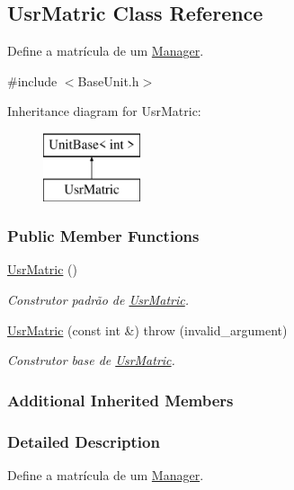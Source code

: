 \hypertarget{classUsrMatric}{\subsection{Usr\-Matric Class Reference}
\label{d4/d69/classUsrMatric}
}


Define a matrícula de um \hyperlink{classManager}{Manager}.  




{\ttfamily \#include $<$Base\-Unit.\-h$>$}

Inheritance diagram for Usr\-Matric\-:\begin{figure}[H]
\begin{center}
\leavevmode
\includegraphics[height=2.000000cm]{d4/d69/classUsrMatric}
\end{center}
\end{figure}
\subsubsection*{Public Member Functions}
\begin{DoxyCompactItemize}
\item 
\hyperlink{classUsrMatric_afbc07d30168283743b0c9c5d690dac5f}{Usr\-Matric} ()
\begin{DoxyCompactList}\small\item\em Construtor padrão de \hyperlink{classUsrMatric}{Usr\-Matric}. \end{DoxyCompactList}\item 
\hyperlink{classUsrMatric_acc7320dcfc8978fe9cc142340adb99c1}{Usr\-Matric} (const int \&)  throw (invalid\-\_\-argument)
\begin{DoxyCompactList}\small\item\em Construtor base de \hyperlink{classUsrMatric}{Usr\-Matric}. \end{DoxyCompactList}\end{DoxyCompactItemize}
\subsubsection*{Additional Inherited Members}


\subsubsection{Detailed Description}
Define a matrícula de um \hyperlink{classManager}{Manager}. 

